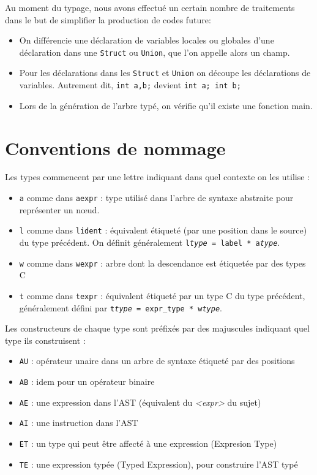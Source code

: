 \documentclass[a4paper]{article}
\begin{document}
Au moment du typage, nous avons effectué un certain nombre de traitements
dans le but de simplifier la production de codes future:
\begin{itemize}
\item On différencie une déclaration de variables locales ou globales d'une
déclaration dans une \texttt{Struct} ou \texttt{Union}, que l'on appelle
alors un champ.
\item Pour les déclarations dans les \texttt{Struct} et \texttt{Union} on
découpe les déclarations de variables. Autrement dit, \texttt{int a,b;}
devient \texttt{int a; int b;}
\item Lors de la génération de l'arbre typé, 
on vérifie qu'il existe une fonction main.
\end{itemize}

\appendix
\section{Conventions de nommage}

Les types commencent par une lettre indiquant dans quel contexte on les utilise :
\begin{itemize}
    \item \texttt{a} comme dans \texttt{aexpr} : type utilisé dans l'arbre de syntaxe abstraite pour représenter un nœud.
    \item \texttt{l} comme dans \texttt{lident} : équivalent étiqueté (par une position dans le source) du type précédent.
    On définit généralement \texttt{l\emph{type} = label * a\emph{type}}.
\item \texttt{w} comme dans \texttt{wexpr} : arbre dont la descendance est étiquetée par des types C
\item \texttt{t} comme dans \texttt{texpr} : équivalent étiqueté par un type C du type précédent, généralement défini par \texttt{t\emph{type} = expr\_type * w\emph{type}}.
\end{itemize}

Les constructeurs de chaque type sont préfixés par des majuscules indiquant quel type ils construisent :
\begin{itemize}
    \item \texttt{AU} : opérateur unaire dans un arbre de syntaxe étiqueté par des positions
    \item \texttt{AB} : idem pour un opérateur binaire
    \item \texttt{AE} : une expression dans l'AST (équivalent du \emph{<expr>} du sujet)
    \item \texttt{AI} : une instruction dans l'AST
    \item \texttt{ET} : un type qui peut être affecté à une expression (Expresion Type)
    \item \texttt{TE} : une expression typée (Typed Expression), pour construire l'AST typé
\end{itemize}
\end{document}
